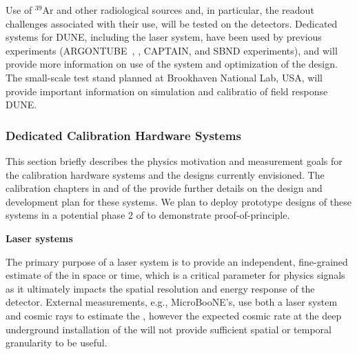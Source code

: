 Use of  ${}^{39}$Ar  and other radiological sources and, in particular, the  readout challenges associated with their use, will be tested on the  detectors. Dedicated systems for DUNE, 
including the laser system, have been used by previous experiments (ARGONTUBE~\cite{Zeller:2013sva}, \cite{Ereditato:2014aa}, CAPTAIN, and SBND experiments), and will provide more information on use of the system and optimization of the design.  The small-scale \lar test stand planned at Brookhaven National Lab, USA, will provide important information on simulation and calibratio of field response  DUNE.



\subsubsection{Dedicated Calibration Hardware Systems}
\label{sec:phys-calib-hardware}
This section briefly describes the physics motivation and measurement goals for the calibration hardware systems and the designs currently envisioned. The calibration chapters in \voltitlesp{} and \voltitledp{} of the  provide further details on the design and development plan for these systems. We plan to deploy prototype designs of these systems in a potential phase 2 of  to demonstrate proof-of-principle.

\textbf{Laser systems} 

The primary purpose of a laser system is to provide an independent, fine-grained estimate of the \efield in space or time, which is a critical parameter for physics signals as it ultimately impacts the spatial resolution and energy response of the detector. External measurements, e.g.,  MicroBooNE's, use both a laser system and cosmic rays to estimate the \efield, however the expected cosmic rate at the deep underground installation of the  will not provide sufficient spatial or temporal granularity to be useful.

